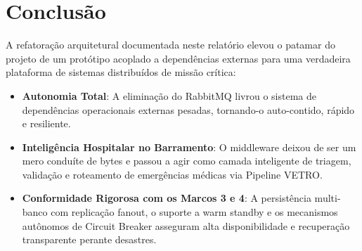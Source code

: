 \documentclass[11pt,a4paper]{article}
\begin{document}
\section{Conclusão}

A refatoração arquitetural documentada neste relatório elevou o patamar do projeto de um protótipo acoplado a dependências externas para uma verdadeira plataforma de sistemas distribuídos de missão crítica:

\begin{itemize}
    \item \textbf{Autonomia Total}: A eliminação do RabbitMQ livrou o sistema de dependências operacionais externas pesadas, tornando-o auto-contido, rápido e resiliente.
    \item \textbf{Inteligência Hospitalar no Barramento}: O middleware deixou de ser um mero conduíte de bytes e passou a agir como camada inteligente de triagem, validação e roteamento de emergências médicas via Pipeline VETRO.
    \item \textbf{Conformidade Rigorosa com os Marcos 3 e 4}: A persistência multi-banco com replicação fanout, o suporte a warm standby e os mecanismos autônomos de Circuit Breaker asseguram alta disponibilidade e recuperação transparente perante desastres.
\end{itemize}
\end{document}

